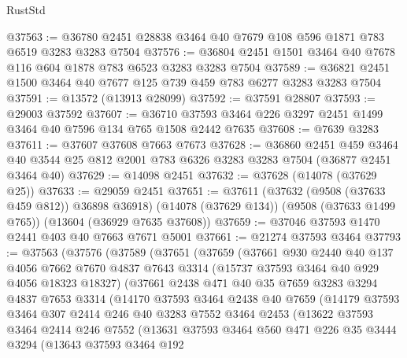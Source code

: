 \begin{lexlean}{RustStd}
\begin{coremodule}
@37563 := @36780 @2451 @28838 @3464 @40 @7679 @108 @596 @1871 @783 @6519 @3283 @3283 @7504
@37576 := @36804 @2451 @1501 @3464 @40 @7678 @116 @604 @1878 @783 @6523 @3283 @3283 @7504
@37589 := @36821 @2451 @1500 @3464 @40 @7677 @125 @739 @459 @783 @6277 @3283 @3283 @7504
@37591 := @13572 (@13913 @28099)
@37592 := @37591 @28807
@37593 := @29003 @37592
@37607 := @36710 @37593 @3464 @226 @3297 @2451 @1499 @3464 @40 @7596 @134 @765 @1508 @2442 @7635
@37608 := @7639 @3283
@37611 := @37607 @37608 @7663 @7673
@37628 := @36860
    @2451
    @459
    @3464
    @40
    @3544
    @25
    @812
    @2001
    @783
    @6326
    @3283
    @3283
    @7504
    (@36877 @2451 @3464 @40)
@37629 := @14098 @2451
@37632 := @37628 (@14078 (@37629 @25))
@37633 := @29059 @2451
@37651 := @37611
    (@37632 (@9508 (@37633 @459 @812)) @36898 @36918)
    (@14078 (@37629 @134))
    (@9508 (@37633 @1499 @765))
    (@13604 (@36929 @7635 @37608))
@37659 := @37046 @37593 @1470 @2441 @403 @40 @7663 @7671 @5001
@37661 := @21274 @37593 @3464
@37793 := @37563
    (@37576
      (@37589
        (@37651
          (@37659
            (@37661
              @930
              @2440
              @40
              @137
              @4056
              @7662
              @7670
              @4837
              @7643
              @3314
              (@15737 @37593 @3464 @40 @929 @4056 @18323 @18327)
              (@37661
                @2438
                @471
                @40
                @35
                @7659
                @3283
                @3294
                @4837
                @7653
                @3314
                (@14170
                  @37593
                  @3464
                  @2438
                  @40
                  @7659
                  (@14179
                    @37593
                    @3464
                    @307
                    @2414
                    @246
                    @40
                    @3283
                    @7552
                    @3464
                    @2453
                    (@13622
                      @37593
                      @3464
                      @2414
                      @246
                      @7552
                      (@13631
                        @37593
                        @3464
                        @560
                        @471
                        @226
                        @35
                        @3444
                        @3294
                        (@13643
                          @37593
                          @3464
                          @192

\end{coremodule}
\end{lexlean}

